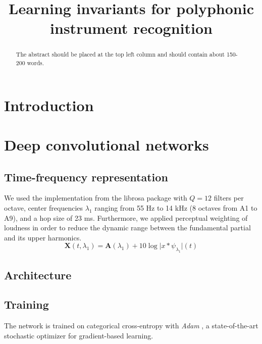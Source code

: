 \documentclass{article}
\title{Learning invariants for polyphonic instrument recognition}
\begin{document}
%
\maketitle
%
\begin{abstract}
The abstract should be placed at the top left column and should contain about 150-200 words.
\end{abstract}
%

\section{Introduction}\label{sec:introduction}


\section{Deep convolutional networks}
\subsection{Time-frequency representation}
We used the implementation from the librosa package \cite{McFee2015} with $Q=12$ filters per octave, center frequencies $\lambda_1$ ranging from 55 Hz to 14 kHz (8 octaves from A1 to A9), and a hop size of 23 ms. Furthermore, we applied perceptual weighting of loudness in order to reduce the dynamic range between the fundamental partial and its upper harmonics.
\begin{equation}
\mathbf{X}(t, \lambda_1) = \mathbf{A}(\lambda_1) + 10 \log \vert x \ast \psi_{\lambda_1} \vert (t)
\end{equation}


\subsection{Architecture}

\subsection{Training}
The network is trained on categorical cross-entropy with \emph{Adam} \cite{Kingma2015}, a state-of-the-art stochastic optimizer for gradient-based learning.
\end{document}
